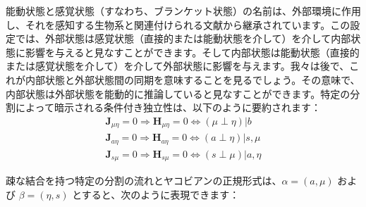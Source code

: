 \documentclass[a4paper, titlepage]{jsarticle}
\begin{document}
能動状態と感覚状態（すなわち、ブランケット状態）の名前は、外部環境に作用し、それを感知する生物系と関連付けられる文献から継承されています。この設定では、外部状態は感覚状態（直接的または能動状態を介して）を介して内部状態に影響を与えると見なすことができます。そして内部状態は能動状態（直接的または感覚状態を介して）を介して外部状態に影響を与えます。我々は後で、これが内部状態と外部状態間の同期を意味することを見るでしょう。その意味で、内部状態は外部状態を能動的に推論していると見なすことができます。特定の分割によって暗示される条件付き独立性は、以下のように要約されます：
\begin{equation}
    \begin{aligned}
        \mathbf{J}_{\mu\eta} = 0 \Rightarrow \mathbf{H}_{\mu\eta} = 0 \Leftrightarrow (\mu \perp \eta) | b \\
        \mathbf{J}_{a\eta} = 0 \Rightarrow \mathbf{H}_{a\eta} = 0 \Leftrightarrow (a \perp \eta) | s, \mu \\
        \mathbf{J}_{s\mu} = 0 \Rightarrow \mathbf{H}_{s\mu} = 0 \Leftrightarrow (s \perp \mu) | a, \eta
    \end{aligned}
\end{equation}
\par
疎な結合を持つ特定の分割の流れとヤコビアンの正規形式は、$\alpha = (a, \mu)$ および $\beta = (\eta, s)$ とすると、次のように表現できます：
\end{document}
